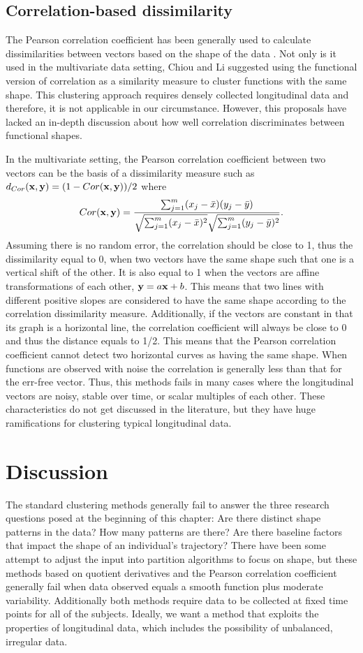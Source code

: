 \subsection{Correlation-based dissimilarity}
The Pearson correlation coefficient has been generally used to calculate dissimilarities between vectors based on the shape of the data  \cite{chouakria2007,  eisen1998}. Not only is it used in the multivariate data setting, Chiou and Li \cite{chiou2008} suggested using the functional version of correlation as a similarity measure to cluster functions with the same shape. This clustering approach requires densely collected longitudinal data and therefore, it is not applicable in our circumstance. However, this proposals have lacked an in-depth discussion about how well correlation discriminates between functional shapes.

In the multivariate setting, the Pearson correlation coefficient between two vectors can be the basis of a dissimilarity measure such as $d_{Cor}(\mathbf x,\mathbf y) = (1-Cor(\mathbf x,\mathbf y))/2$ where $$Cor(\mathbf x,\mathbf y) = \frac{\sum^{m}_{j=1}(x_{j}-\bar{x})(y_{j}-\bar{y})}{\sqrt{\sum^{m}_{j=1}(x_{j}-\bar{x})^{2}}\sqrt{\sum^{m}_{j=1}(y_{j}-\bar{y})^{2}}}.$$
Assuming there is no random error, the correlation should be close to 1, thus the dissimilarity equal to 0, when two vectors have the same shape such that one is a vertical shift of the other. It is also equal to 1 when the vectors are affine transformations of each other, $\mathbf y = a\mathbf x + b$. This means that two lines with different positive slopes are considered to have the same shape according to the correlation dissimilarity measure. Additionally, if the vectors are constant in that its graph is a horizontal line, the correlation coefficient will always be close to 0 and thus the distance equals to 1/2. This means that the Pearson correlation coefficient cannot detect two horizontal curves as having the same shape.  When functions are observed with noise the correlation is generally less than that for the err-free vector. Thus, this methods fails in many cases where the longitudinal vectors are noisy, stable over time, or scalar multiples of each other. These characteristics do not get discussed in the literature, but they have huge ramifications for clustering typical longitudinal data.

\section{Discussion}
The standard clustering methods generally fail to answer the three research questions posed at the beginning of this chapter: Are there distinct shape patterns in the data? How many patterns are there? Are there baseline factors that impact the shape of an individual's trajectory? There have been some attempt to adjust the input into partition algorithms to focus on shape, but these methods based on quotient derivatives and the Pearson correlation coefficient generally fail when data observed equals a smooth function plus moderate variability. Additionally both methods require data to be collected at fixed time points for all of the subjects. Ideally, we want a method that exploits the properties of longitudinal data, which includes the possibility of unbalanced, irregular data.

